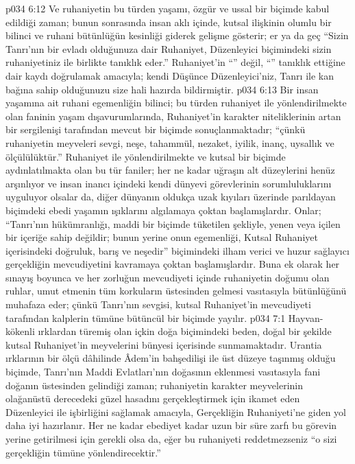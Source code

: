 \vs p034 6:12 Ve ruhaniyetin bu türden yaşamı, özgür ve ussal bir biçimde kabul edildiği zaman; bunun sonrasında insan aklı içinde, kutsal ilişkinin olumlu bir bilinci ve ruhani bütünlüğün kesinliği giderek gelişme gösterir; er ya da geç “Sizin Tanrı’nın bir evladı olduğunuza dair Ruhaniyet, Düzenleyici biçimindeki sizin ruhaniyetiniz ile birlikte tanıklık eder.” Ruhaniyet’in “” değil, “” tanıklık ettiğine dair kaydı doğrulamak amacıyla; kendi Düşünce Düzenleyici’niz, Tanrı ile kan bağına sahip olduğunuzu size hali hazırda bildirmiştir.
\vs p034 6:13 Bir insan yaşamına ait ruhani egemenliğin bilinci; bu türden ruhaniyet ile yönlendirilmekte olan faninin yaşam dışavurumlarında, Ruhaniyet’in karakter niteliklerinin artan bir sergilenişi tarafından mevcut bir biçimde sonuçlanmaktadır; “çünkü ruhaniyetin meyveleri sevgi, neşe, tahammül, nezaket, iyilik, inanç, uysallık ve ölçülülüktür.” Ruhaniyet ile yönlendirilmekte ve kutsal bir biçimde aydınlatılmakta olan bu tür faniler; her ne kadar uğraşın alt düzeylerini henüz arşınlıyor ve insan inancı içindeki kendi dünyevi görevlerinin sorumluluklarını uyguluyor olsalar da, diğer dünyanın oldukça uzak kıyıları üzerinde parıldayan biçimdeki ebedi yaşamın ışıklarını algılamaya çoktan başlamışlardır. Onlar; “Tanrı’nın hükümranlığı, maddi bir biçimde tüketilen şekliyle, yenen veya içilen bir içeriğe sahip değildir; bunun yerine onun egemenliği, Kutsal Ruhaniyet içerisindeki doğruluk, barış ve neşedir” biçimindeki ilham verici ve huzur sağlayıcı gerçekliğin mevcudiyetini kavramaya çoktan başlamışlardır. Buna ek olarak her sınayış boyunca ve her zorluğun mevcudiyeti içinde ruhaniyetin doğumu olan ruhlar, umut etmenin tüm korkuların üstesinden gelmesi vasıtasıyla bütünlüğünü muhafaza eder; çünkü Tanrı’nın sevgisi, kutsal Ruhaniyet’in mevcudiyeti tarafından kalplerin tümüne bütüncül bir biçimde yayılır.
\vs p034 7:1 Hayvan\hyp{}kökenli ırklardan türemiş olan içkin doğa biçimindeki beden, doğal bir şekilde kutsal Ruhaniyet’in meyvelerini bünyesi içerisinde sunmamaktadır. Urantia ırklarının bir ölçü dâhilinde Âdem’in bahşedilişi ile üst düzeye taşınmış olduğu biçimde, Tanrı’nın Maddi Evlatları’nın doğasının eklenmesi vasıtasıyla fani doğanın üstesinden gelindiği zaman; ruhaniyetin karakter meyvelerinin olağanüstü derecedeki güzel hasadını gerçekleştirmek için ikamet eden Düzenleyici ile işbirliğini sağlamak amacıyla, Gerçekliğin Ruhaniyeti’ne giden yol daha iyi hazırlanır. Her ne kadar ebediyet kadar uzun bir süre zarfı bu görevin yerine getirilmesi için gerekli olsa da, eğer bu ruhaniyeti reddetmezseniz “o sizi gerçekliğin tümüne yönlendirecektir.”
